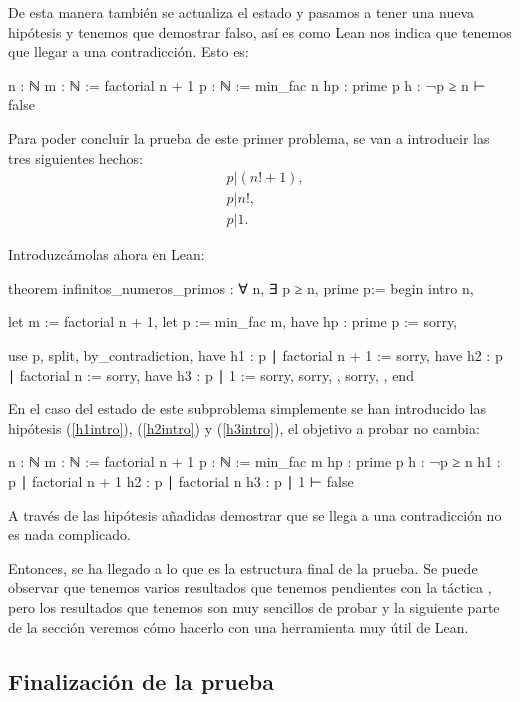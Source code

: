 De esta manera también se actualiza el estado y pasamos a tener una
nueva hipótesis y tenemos que demostrar falso, así es como Lean nos
indica que tenemos que llegar a una contradicción. Esto es:
\begin{leancode}
n : ℕ
m : ℕ := factorial n + 1
p : ℕ := min_fac n
hp : prime p
h : ¬p ≥ n
⊢ false
\end{leancode}

Para poder concluir la prueba de este primer problema, se van a introducir
las tres siguientes hechos:
\begin{align}
  &p | (n!+1),\tag{h1}\label{h1intro}\\
  &p | n!,    \tag{h2}\label{h2intro}\\
  &p | 1.     \tag{h3}\label{h3intro}
\end{align}

Introduzcámolas ahora en Lean:
\begin{leancode}
theorem infinitos_numeros_primos : ∀ n, ∃ p ≥ n, prime p:=
begin
  intro n,

  let m := factorial n + 1,
  let p := min_fac m,
  have hp : prime p := sorry,

  use p,
  split,
  { by_contradiction,
    have h1 : p ∣ factorial n + 1 := sorry,
    have h2 : p ∣ factorial n := sorry,
    have h3 : p ∣ 1 := sorry,
    sorry, },
  { sorry, },
end
\end{leancode}

En el caso del estado de este subproblema simplemente se han introducido las
hipótesis (\ref{h1intro}), (\ref{h2intro}) y (\ref{h3intro}), el objetivo a
probar no cambia:
\begin{leancode}
n : ℕ
m : ℕ := factorial n + 1
p : ℕ := min_fac m
hp : prime p
h : ¬p ≥ n
h1 : p ∣ factorial n + 1
h2 : p ∣ factorial n
h3 : p ∣ 1
⊢ false
\end{leancode}

A través de las hipótesis añadidas demostrar que se llega a una
contradicción no es nada complicado.

Entonces, se ha llegado a lo que es la estructura final de la prueba. Se
puede observar que tenemos varios resultados que tenemos pendientes con
la táctica , pero los resultados que tenemos son
muy sencillos de probar y la siguiente parte de la sección veremos cómo
hacerlo con una herramienta muy útil de Lean.

\subsection{Finalización de la prueba}

